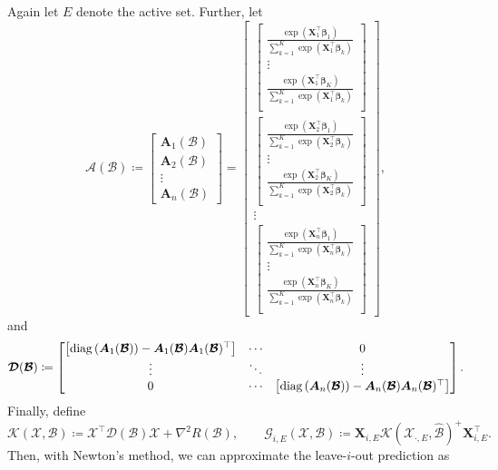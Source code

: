 \documentclass[11pt]{article}
\newcommand{\bX}{\bm{X}}
\newcommand{\bbeta}{\bm{\beta}}
\newcommand{\bXb}{\bm{\mathcal{X}}}
\newcommand{\bBb}{\bm{\mathcal{B}}}
\begin{document}
Again let \(E\) denote the active set. Further, let \[\bm{\mathcal{A}}(\bBb)\coloneqq\begin{bmatrix}
\bm{A}_1(\bBb) \\
\bm{A}_2(\bBb) \\
\vdots \\
\bm{A}_n(\bBb)
\end{bmatrix}=\begin{bmatrix}
\begin{bmatrix}\frac{\exp\left(\bX_1^\top\bbeta_1\right)}{\sum_{k=1}^K\exp\left(\bX_1^\top\bbeta_k\right)} \\
\vdots \\
\frac{\exp\left(\bX_1^\top\bbeta_K\right)}{\sum_{k=1}^K\exp\left(\bX_1^\top\bbeta_k\right)} \\
\end{bmatrix} \\
\begin{bmatrix}
\frac{\exp\left(\bX_2^\top\bbeta_1\right)}{\sum_{k=1}^K\exp\left(\bX_2^\top\bbeta_k\right)} \\
\vdots \\
\frac{\exp\left(\bX_2^\top\bbeta_K\right)}{\sum_{k=1}^K\exp\left(\bX_2^\top\bbeta_k\right)} \\
\end{bmatrix} \\
\vdots \\
\begin{bmatrix}
\frac{\exp\left(\bX_n^\top\bbeta_1\right)}{\sum_{k=1}^K\exp\left(\bX_n^\top\bbeta_k\right)} \\
\vdots \\
\frac{\exp\left(\bX_n^\top\bbeta_K\right)}{\sum_{k=1}^K\exp\left(\bX_n^\top\bbeta_k\right)} \\
\end{bmatrix}\end{bmatrix},\] and \[\bm{\mathcal{D}}(\bm{\mathcal{B}})\coloneqq\begin{bmatrix}
\left[{\rm diag}\left(\bm{A}_1(\bm{\mathcal{B}})\right)-\bm{A}_1(\bm{\mathcal{B}})\bm{A}_1(\bm{\mathcal{B}})^\top\right] & \cdots & 0 \\
\vdots & \ddots & \vdots \\
0 & \cdots & \left[{\rm diag}\left(\bm{A}_n(\bm{\mathcal{B}})\right)-\bm{A}_n(\bm{\mathcal{B}})\bm{A}_n(\bm{\mathcal{B}})^\top\right]\end{bmatrix}.\] Finally, define \[\bm{\mathcal{K}}(\bXb,\bBb)\coloneqq
\bm{\mathcal{X}}^\top
\bm{\mathcal{D}}(\bBb)\bm{\mathcal{X}}+\nabla^2R(\bm{\mathcal{B}}),\qquad\bm{\mathcal{G}}_{i, E}(\bXb,\bBb)\coloneqq\bX_{i, E}\bm{\mathcal{K}}(\bXb_{\cdot,E},\hat{\bBb})^{+}\bX_{i,E}^\top.\] Then, with Newton's method, we can approximate the leave-\(i\)-out prediction as 
\end{document}
